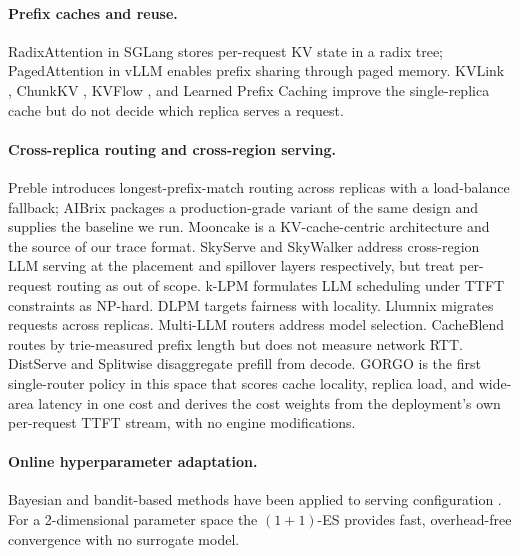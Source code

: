 \documentclass{article}
\begin{document}
\paragraph{Prefix caches and reuse.}
RadixAttention in SGLang \citep{sglang2024} stores per-request KV state in a
radix tree; PagedAttention in vLLM \citep{vllm2023} enables prefix sharing
through paged memory. KVLink \citep{kvlink2025}, ChunkKV \citep{chunkkv2025},
KVFlow \citep{kvflow2025}, and Learned Prefix Caching \citep{lpc2025} improve
the single-replica cache but do not decide which replica serves a request.

\paragraph{Cross-replica routing and cross-region serving.}
Preble \citep{preble} introduces longest-prefix-match routing across replicas
with a load-balance fallback; AIBrix \citep{aibrix2024} packages a
production-grade variant of the same design and supplies the baseline we run.
Mooncake \citep{qin2024mooncake} is a KV-cache-centric architecture and the
source of our trace format. SkyServe \citep{skyserve} and SkyWalker
\citep{skywalker} address cross-region LLM serving at the placement and
spillover layers respectively, but treat per-request routing as out of scope.
k-LPM \citep{klpm2025} formulates LLM scheduling under TTFT constraints as
NP-hard. DLPM \citep{dlpm2025} targets fairness with locality. Llumnix
\citep{llumnix2024} migrates requests across replicas. Multi-LLM routers
\citep{routerwu2025} address model selection. CacheBlend
\citep{yao2024cacheblend} routes by trie-measured prefix length but does not
measure network RTT. DistServe \citep{distserve2024} and Splitwise
\citep{splitwise2024} disaggregate prefill from decode. GORGO is the first
single-router policy in this space that scores cache locality, replica load,
and wide-area latency in one cost and derives the cost weights from the
deployment's own per-request TTFT stream, with no engine modifications.

\paragraph{Online hyperparameter adaptation.}
Bayesian and bandit-based methods have been applied to serving configuration
\citep{routerwu2025}. For a 2-dimensional parameter space the $(1{+}1)$-ES
\citep{rechenberg1973} provides fast, overhead-free convergence with no
surrogate model.
\end{document}
